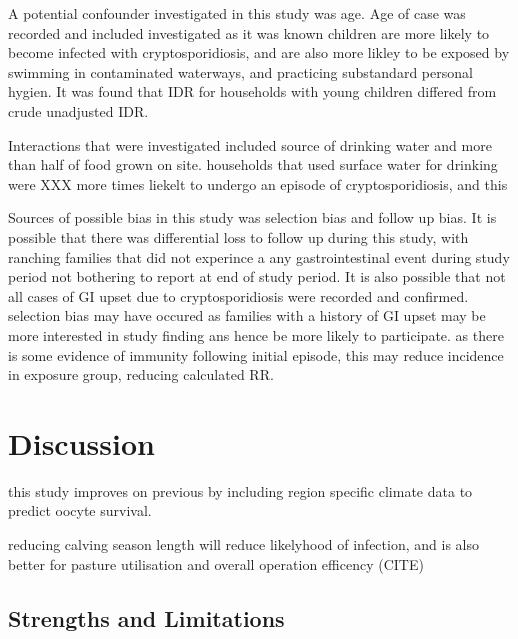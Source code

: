 \documentclass[12pt]{article}
\begin{document}
		A potential confounder investigated in this study was age.
		Age of case was recorded and included investigated as it was known children are more likely to become infected with cryptosporidiosis, and are also more likley to be exposed by swimming in contaminated waterways, and practicing substandard personal hygien.
		It was found that IDR for households with young children differed from crude unadjusted IDR.

		Interactions that were investigated included source of drinking water and more than half of food grown on site.
		households that used surface water for drinking were XXX more times liekelt to undergo an episode of cryptosporidiosis, and this 


		Sources of possible bias in this study was selection bias and follow up bias.
		It is possible that there was differential loss to follow up during this study, with ranching families that did not experince a any gastrointestinal event during study period not bothering to report at end of study period.
		It is also possible that not all cases of GI upset due to cryptosporidiosis were recorded and confirmed. 
		selection bias may have occured as families with a history of GI upset may be more interested in study finding ans hence be more likely to participate. as there is some evidence of immunity following initial episode, this may reduce incidence in exposure group, reducing calculated RR.


	\section{Discussion} 

		this study improves on previous by including region specific climate data \cite{CIMIS} to predict oocyte survival. 

		reducing calving season length will reduce likelyhood of infection, and is also better for pasture utilisation and overall operation efficency (CITE)	

	\subsection{Strengths and Limitations}
		
\end{document}
